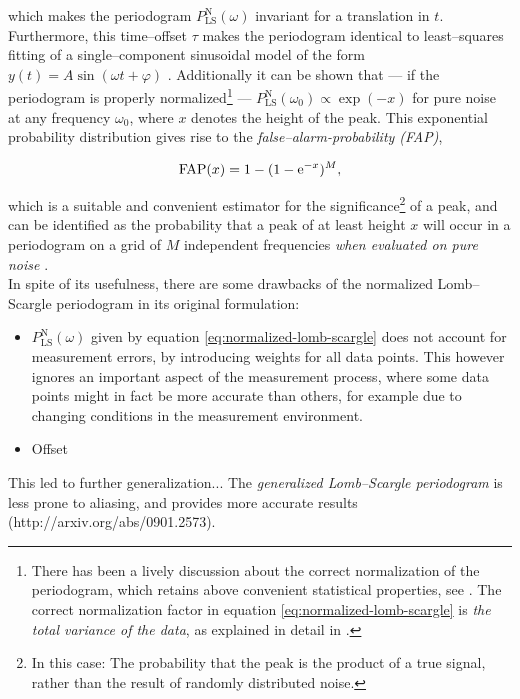 which makes the periodogram $P^{\text{N}}_{\text{LS}}(\omega)$ invariant for a translation in $t$. Furthermore, this time--offset $\tau$ makes the periodogram identical to least--squares fitting of a single--component sinusoidal model of the form $y(t) = A \sin(\omega t + \varphi)$ \citep{horne1986, vanderplas2015}. Additionally it can be shown that --- if the periodogram is properly normalized\footnote{There has been a lively discussion about the correct normalization of the periodogram, which retains above convenient statistical properties, see \citet{lomb1976,astroML,zechmeister2009}. The correct normalization factor in equation \eqref{eq:normalized-lomb-scargle} is \emph{the total variance of the data}, as explained in detail in \citet{horne1986}.} --- $P^{\text{N}}_{\text{LS}}(\omega_0) \propto \exp(-x)$ for pure noise at any frequency $\omega_0$, where $x$ denotes the height of the peak. This exponential probability distribution gives rise to the \emph{false--alarm-probability (FAP)},

\begin{equation}
\text{FAP}(x) = 1 - (1 - \mathrm{e}^{-x})^M,
\end{equation}

which is a suitable and convenient estimator for the significance\footnote{In this case: The probability that the peak is the product of a true signal, rather than the result of randomly distributed noise.} of a peak, and can be identified as the probability that a peak of at least height $x$ will occur in a periodogram on a grid of $M$ independent frequencies \emph{when evaluated on pure noise} \citep{horne1986}.\\

In spite of its usefulness, there are some drawbacks of the normalized Lomb--Scargle periodogram in its original formulation:

\begin{itemize}
\item $P^{\text{N}}_{\text{LS}}(\omega)$ given by equation \eqref{eq:normalized-lomb-scargle} does not account for measurement errors, \eg by introducing weights for all data points. This however ignores an important aspect of the measurement process, where some data points might in fact be more accurate than others, for example due to changing conditions in the measurement environment.
\item Offset %
\end{itemize}

This led to further generalization...
The \emph{generalized Lomb--Scargle periodogram} is less prone to aliasing, and provides more accurate results (http://arxiv.org/abs/0901.2573).

